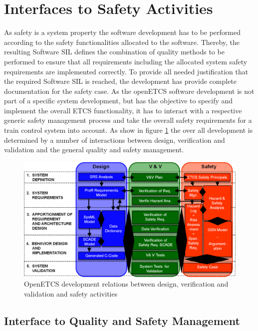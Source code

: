 \documentclass{template/openetcs_report}
\begin{document}
\section{Interfaces to Safety Activities}

As safety is a system property the software development has to be performed according to the safety functionalities allocated to the software. Thereby, the resulting Software SIL defines the combination of quality methods to be performed to ensure that all requirements including the allocated system safety requirements are implemented correctly. To provide all needed justification that the required Software SIL is reached, the development has provide complete documentation for the safety case. As the openETCS software development is not part of a specific system development, but has the objective to specify and implement the overall ETCS functionality, it has to interact with a respective generic safety management process and take the overall safety requirements for a train control system into account. As show in figure \ref{fig:SafetyProcess} the over all development is determined by a number of interactions between design, verification and validation and the general quality and safety management.

\begin{figure}[htbp]
\centering
\includegraphics[width=1\linewidth]{./images/openETCS-Software-Safety-Development}
\caption{OpenETCS development relations between design, verification and validation and safety activities}
\label{fig:SafetyProcess}
\end{figure}


\subsection{Interface to Quality and Safety Management}
\end{document}
